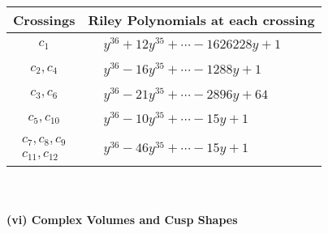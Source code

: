 \documentclass[1p]{elsarticle_modified}
\theoremstyle{definition}
\begin{document}
\begin{tabular}{m{50pt}|m{274pt}}
Crossings & \hspace{64pt}Riley Polynomials at each crossing \\
\hline $$\begin{aligned}c_{1}\end{aligned}$$&$\begin{aligned}
&y^{36}+12 y^{35}+\cdots-1626228 y+1
\end{aligned}$\\
\hline $$\begin{aligned}c_{2},c_{4}\end{aligned}$$&$\begin{aligned}
&y^{36}-16 y^{35}+\cdots-1288 y+1
\end{aligned}$\\
\hline $$\begin{aligned}c_{3},c_{6}\end{aligned}$$&$\begin{aligned}
&y^{36}-21 y^{35}+\cdots-2896 y+64
\end{aligned}$\\
\hline $$\begin{aligned}c_{5},c_{10}\end{aligned}$$&$\begin{aligned}
&y^{36}-10 y^{35}+\cdots-15 y+1
\end{aligned}$\\
\hline $$\begin{aligned}c_{7},c_{8},c_{9}\\c_{11},c_{12}\end{aligned}$$&$\begin{aligned}
&y^{36}-46 y^{35}+\cdots-15 y+1
\end{aligned}$\\
\hline
\end{tabular}\\~\\
\newpage\flushleft \textbf{(vi) Complex Volumes and Cusp Shapes}
\end{document}
